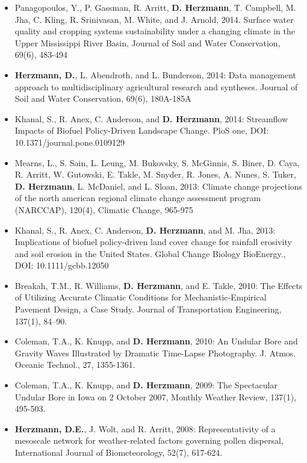 \begin{itemize}
\item Panagopoulos, Y., P. Gassman, R. Arritt, \textbf{D. Herzmann}, T. Campbell, M. Jha, C. Kling, R. Srinivasan, M. White, and J. Arnold, 2014. Surface water quality and cropping systems sustainability under a changing climate in the Upper Mississippi River Basin, Journal of Soil and Water Conservation, 69(6), 483-494
\item \textbf{Herzmann, D.}, L. Abendroth, and L. Bunderson, 2014: Data management approach to multidisciplinary agricultural research and syntheses. Journal of Soil and Water Conservation, 69(6), 180A-185A
\item Khanal, S., R. Anex, C. Anderson, and \textbf{D. Herzmann}, 2014: Streamflow Impacts of Biofuel Policy-Driven Landscape Change. PloS one, DOI: 10.1371/journal.pone.0109129
\item Mearns, L., S. Sain, L. Leung, M. Bukovsky, S. McGinnis, S. Biner, D. Caya, R. Arritt, W. Gutowski, E. Takle, M. Snyder, R. Jones, A. Nunes, S. Tuker, \textbf{D. Herzmann}, L. McDaniel, and L. Sloan, 2013: Climate change projections of the north american regional climate change assessment program (NARCCAP), 120(4), Climatic Change, 965-975
\item Khanal, S., R. Anex, C. Anderson, \textbf{D. Herzmann}, and M. Jha, 2013: Implications of biofuel policy-driven land cover change for rainfall erosivity and soil erosion in the United States. Global Change Biology BioEnergy., DOI: 10.1111/gcbb.12050
\item Breakah, T.M., R. Williams, \textbf{D. Herzmann}, and E. Takle, 2010: The Effects of Utilizing Accurate Climatic Conditions for Mechanistic-Empirical Pavement Design, a Case Study. Journal of Transportation Engineering, 137(1), 84–90.
\item Coleman, T.A., K. Knupp, and \textbf{D. Herzmann}, 2010: An Undular Bore and Gravity Waves Illustrated by Dramatic Time-Lapse Photography. J. Atmos. Oceanic Technol., 27, 1355-1361.
\item Coleman, T.A., K. Knupp, and \textbf{D. Herzmann}, 2009: The Spectacular Undular Bore in Iowa on 2 October 2007, Monthly Weather Review, 137(1), 495-503.
\item \textbf{Herzmann, D.E.}, J. Wolt, and R. Arritt, 2008: Representativity of a mesoscale network for weather-related factors governing pollen dispersal, International Journal of Biometeorology, 52(7), 617-624.

\end{itemize}
